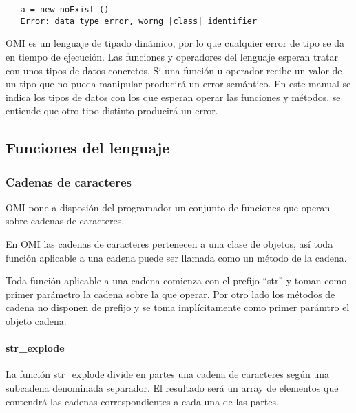 \begin{lstlisting}
   a = new noExist ()
   Error: data type error, worng |class| identifier
\end{lstlisting}

OMI es un lenguaje de tipado dinámico, por lo que cualquier error de tipo se da en tiempo de ejecución. Las funciones y operadores
del lenguaje esperan tratar con unos tipos de datos concretos. Si una función u operador recibe un valor de un tipo 
que no pueda manipular producirá un error semántico. En este manual se indica los tipos de datos con los que esperan operar 
las funciones y métodos, se entiende que otro tipo distinto producirá un error. 

\subsection{Funciones del lenguaje}
\subsubsection{Cadenas de caracteres}
OMI pone a disposión del programador un conjunto de funciones que operan sobre cadenas de caracteres.

En OMI las cadenas de caracteres pertenecen a una clase de objetos, así toda función aplicable a una cadena
puede ser llamada como un método de la cadena. 

Toda función aplicable a una cadena comienza con el prefijo ``str'' y toman como primer parámetro la cadena sobre la que 
operar. Por otro lado los métodos de cadena no disponen de prefijo y se toma implícitamente como primer parámtro el objeto 
cadena. 



\paragraph {str\_explode}
La función str\_explode divide en partes una cadena de caracteres según una subcadena denominada separador. El resultado 
será un array de elementos que contendrá las cadenas correspondientes a cada una de las partes. 

